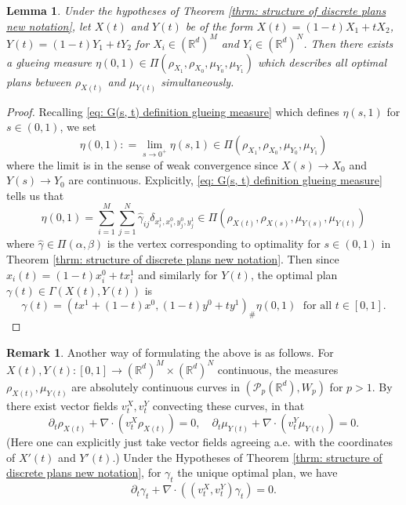 \documentclass[11pt, oneside, titlepage]{book}
\theoremstyle{plain}
\newtheorem{lemma}[theorem]{Lemma}
\theoremstyle{definition}
\newtheorem{remark}[theorem]{Remark}
\newcommand{\R}{\mathbb{R}}
\begin{document}
\begin{lemma}
    Under the hypotheses of Theorem \ref{thrm: structure of discrete plans new notation}, let $X(t)$ and $Y(t)$ be of the form $X(t) = (1-t)X_1 + t X_2$, $Y(t) = (1-t)Y_1 + t Y_2$ for $X_i \in (\R^d)^M$ and $Y_i \in (\R^d)^N$. Then there exists a glueing measure $\eta(0, 1) \in \Pi(\rho_{X_1}, \rho_{X_0}, \mu_{Y_0}, \mu_{Y_1})$ which describes all optimal plans between $\rho_{X(t)}$ and $\mu_{Y(t)}$ simultaneously.
\end{lemma}
\begin{proof}
    Recalling \eqref{eq: G(s, t) definition glueing measure} which defines $\eta(s, 1)$ for $s \in (0, 1)$, we set
    \begin{equation*}
        \eta(0, 1) : = \lim_{s \to 0^+} \eta(s, 1) \in \Pi(\rho_{X_1}, \rho_{X_0}, \mu_{Y_0}, \mu_{Y_1})
    \end{equation*}
    where the limit is in the sense of weak convergence since $X(s) \to X_0$ and $Y(s) \to Y_0$ are continuous. Explicitly, \eqref{eq: G(s, t) definition glueing measure} tells us that 
    \begin{equation*}
        \eta(0, 1) = \sum_{i=1}^M \sum_{j = 1}^N \hat\gamma_{ij} \delta_{x_i^1, x_i^0, y_j^0, y_j^1} \in \Pi(\rho_{X(t)}, \rho_{X(s)}, \mu_{Y(s)}, \mu_{Y(t)})
    \end{equation*}
    where $\hat \gamma \in \Pi(\alpha, \beta)$ is the vertex corresponding to optimality for $s \in (0, 1)$ in Theorem \ref{thrm: structure of discrete plans new notation}. Then since $x_i(t) = (1-t)x_i^0 + t x_i^1$ and similarly for $Y(t)$, the optimal plan $\gamma(t) \in \Gamma(X(t), Y(t))$ is
    \begin{equation*}
        \gamma(t) = ( tx^1 + (1-t)x^0, (1-t)y^0 + t y^1)_\# \eta(0, 1) \; \text{ for all } t \in [0, 1].
    \end{equation*}
\end{proof}

\begin{remark}
    Another way of formulating the above is as follows. For $X(t), Y(t) : [0, 1] \to (\R^d)^M \times (\R^d)^N$ continuous, the measures $\rho_{X(t)}, \mu_{Y(t)}$ are absolutely continuous curves in $(\mathcal{P}_p(\R^d),W_p)$ for $p>1$. By \cite[Chapter 5]{santambrogio2015optimal} there exist vector fields $v^X_t, v_t^Y$ convecting these curves, in that
    \begin{equation*}
        \partial_t \rho_{X(t)} + \nabla \cdot (v_t^X\rho_{X(t)}) = 0, \quad \partial_t \mu_{Y(t)} + \nabla \cdot (v_t^Y\mu_{Y(t)}) = 0.
    \end{equation*}
    (Here one can explicitly just take vector fields agreeing a.e. with the coordinates of $X'(t)$ and $Y'(t)$.)
    Under the Hypotheses of Theorem \ref{thrm: structure of discrete plans new notation}, for $\gamma_t$ the unique optimal plan, we have
    \begin{equation*}
        \partial_t \gamma_t + \nabla \cdot ((v_t^X, v_t^Y) \gamma_t) = 0.
    \end{equation*}
\end{remark}
\end{document}
